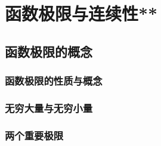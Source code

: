 \chapter{函数极限与连续性**}
\section{函数极限的概念}
\subsection{函数极限的性质与概念}
\clearpage
\subsection{无穷大量与无穷小量}
\clearpage
\subsection{两个重要极限}
\clearpage

